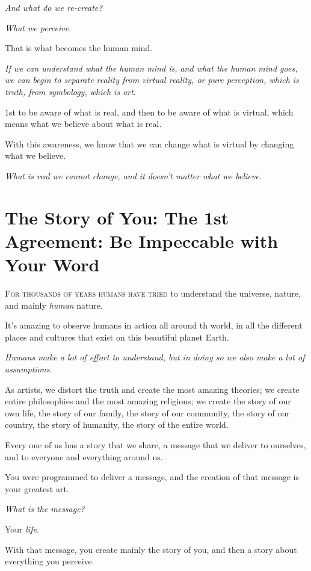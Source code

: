 \documentclass{article}
\numberwithin{equation}{section}
\begin{document}
\textit{And what do we re-create?}

\textit{What we perceive}.

That is what becomes the human mind.

%
\textit{If we can understand what the human mind is, and what the human mind goes, we can begin to separate reality from virtual reality, or pure perception, which is truth, from symbology, which is art}.


1st to be aware of what is real, and then to be aware of what is virtual, which means what we believe about what is real.

With this awareness, we know that we can change what is virtual by changing what we believe.

\textit{What is real we cannot change, and it doesn't matter what we believe}.

\section{The Story of You: The 1st Agreement: Be Impeccable with Your Word}
\textsc{For thousands of years humans have tried} to understand the universe, nature, and mainly \textit{human} nature.

It's amazing to observe humans in action all around th world, in all the different places and cultures that exist on this beautiful planet Earth.

\textit{Humans make a lot of effort to understand, but in doing so we also make a lot of assumptions}.

As artists, we distort the truth and create the most amazing theories; we create entire philosophies and the most amazing religions; we create the story of our own life, the story of our family, the story of our community, the story of our country, the story of humanity, the story of the entire world.

Every one of us has a story that we share, a message that we deliver to ourselves, and to everyone and everything around us.

%
You were programmed to deliver a message, and the creation of that message is your greatest art.

\textit{What is the message?}

Your \textit{life}.

With that message, you create mainly the story of you, and then a story about everything you perceive.
\end{document}
